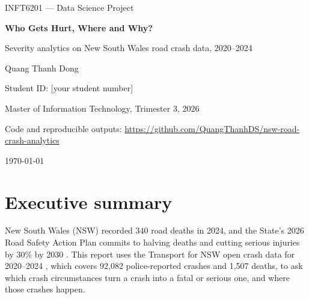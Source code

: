 \documentclass[11pt,a4paper]{article}
\begin{document}
\begin{titlepage}
  \centering
  \vspace*{3cm}
  {\Large\color{accent} INFT6201 --- Data Science Project\par}
  \vspace{1.2cm}
  {\Huge\bfseries Who Gets Hurt, Where and Why?\par}
  \vspace{0.4cm}
  {\Large Severity analytics on New South Wales road crash data, 2020--2024\par}
  \vspace{2cm}
  {\large Quang Thanh Dong\par}
  {\large Student ID: [your student number]\par}
  \vspace{0.6cm}
  {\large Master of Information Technology, Trimester 3, 2026\par}
  \vfill
  {\small Code and reproducible outputs: \url{https://github.com/QuangThanhDS/nsw-road-crash-analytics}\par}
  \vspace{0.5cm}
  {\small \today\par}
\end{titlepage}

\section*{Executive summary}

New South Wales (NSW) recorded 340 road deaths in 2024, and the State's 2026 Road Safety Action Plan
commits to halving deaths and cutting serious injuries by 30\% by 2030
\parencite{tfnsw_actionplan,tfnsw_toll2024}. This report uses the Transport for NSW open crash data
for 2020--2024 \parencite{tfnsw_crashdata}, which covers 92,082 police-reported crashes and 1,507 deaths, to ask
which crash circumstances turn a crash into a fatal or serious one, and where those crashes happen.
\end{document}
